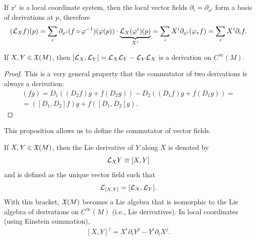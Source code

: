 \begin{cor}
    If $x^i$ is a local coordinate system, then the local vector fields $\partial_i=\partial_{x^i}$ form a basis of derivations at $p$, therefore 
    \[(\mathcal{L}_X f)(p)=\sum_i \partial_{x^i}(f\circ\varphi^{-1})(\varphi(p))\cdot \underbrace{\mathcal{L}_X (\varphi^i)(p)}_{X^i}=\sum_i X^i \partial_{x^i}(\varphi_\ast f)=\sum_i X^i \partial_{i} f.\]
\end{cor}

\begin{prop}
    If $X,Y\in\mathfrak{X}(M)$, then $[\mathcal{L}_X,\mathcal{L}_Y]=\mathcal{L}_X\mathcal{L}_Y-\mathcal{L}_Y\mathcal{L}_X$ is a derivation on $C^\infty(M)$.
\end{prop}
\begin{proof}
    This is a very general property that the commutator of two derivations is always a derivation:
    \begin{multline}
        [D_1,D_2](fg)=D_1((D_2f)g+f(D_2g))-D_2((D_1f)g+f(D_1g))=\\=([D_1,D_2]f)g+f([D_1,D_2]g).
    \end{multline}
\end{proof}

This proposition allows us to define the commutator of vector fields.

\begin{defn}
    If $X,Y\in\mathfrak{X}(M)$, then the Lie derivative of $Y$ along $X$ is denoted by 
    \[\mathcal{L}_X Y\equiv [X,Y]\] and is defined as the unique vector field such that
    \[\mathcal{L}_{[X,Y]}=[\mathcal{L}_X,\mathcal{L}_Y].\]
    With this bracket, $\mathfrak{X}(M)$ becomes a Lie algebra that is isomorphic to the Lie algebra of derivations on $C^\infty(M)$ (i.e., Lie derivatives).
    In local coordinates (using Einstein summation),
    \[[X,Y]^j=X^i \partial_i Y^j-Y^i \partial_i X^j.\label{eq Lie derivative in components}\]
\end{defn}

